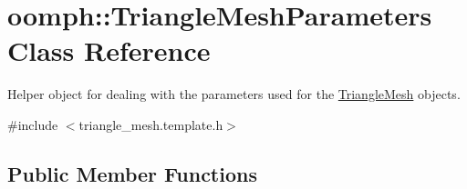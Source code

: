 \hypertarget{classoomph_1_1TriangleMeshParameters}{}\section{oomph\+:\+:Triangle\+Mesh\+Parameters Class Reference}
\label{classoomph_1_1TriangleMeshParameters}


Helper object for dealing with the parameters used for the \hyperlink{classoomph_1_1TriangleMesh}{Triangle\+Mesh} objects.  




{\ttfamily \#include $<$triangle\+\_\+mesh.\+template.\+h$>$}

\subsection*{Public Member Functions}
